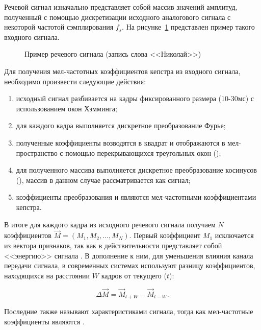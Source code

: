 Речевой сигнал изначально представляет собой массив значений амплитуд, полученный с помощью дискретизации исходного аналогового сигнала с некоторой частотой сэмплирования $f_s$. На рисунке~\ref{fig:waveform} представлен пример такого входного сигнала.

\begin{figure}[h!]
\caption{Пример речевого сигнала (запись слова <<Николай>>)}
\label{fig:waveform}
\end{figure}

Для получения мел-частотных коэффициентов кепстра из входного сигнала, необходимо произвести следующие действия:

\begin{enumerate}
\item исходный сигнал разбивается на кадры фиксированного размера (10-30мс) с использованием окон Хэмминга;
\item для каждого кадра выполняется дискретное преобразование Фурье;
\item полученные коэффициенты возводятся в квадрат и отображаются в мел-пространство с помощью перекрывающихся треугольных окон ();
\item для полученного массива выполняется дискретное преобразование косинусов (), массив в данном случае рассматривается как сигнал;
\item коэффициенты преобразования и являются мел-частотными коэффициентами кепстра.
\end{enumerate}

В итоге для каждого кадра из исходного речевого сигнала получаем $N$ коэффициентов $\vec M = (M_1, M_2, \ldots, M_N)$. Первый коэффициент $M_1$ исключается из вектора признаков, так как в действительности представляет собой <<энергию>> сигнала \cite{Reynolds95gmm}. В дополнение к ним, для уменьшения влияния канала передачи сигнала, в современных системах используют \cite{Reynolds95gmm} разницу коэффициентов, находящихся на расстоянии $W$ кадров от текущего ($t$):

\begin{equation}
\label{eq:deltamfcc}
\Delta \vec M = \vec M_{t+W} - \vec M_{t-W}.
\end{equation}

Последние также называют  характеристиками сигнала, тогда как мел-частотные коэффициенты являются .

